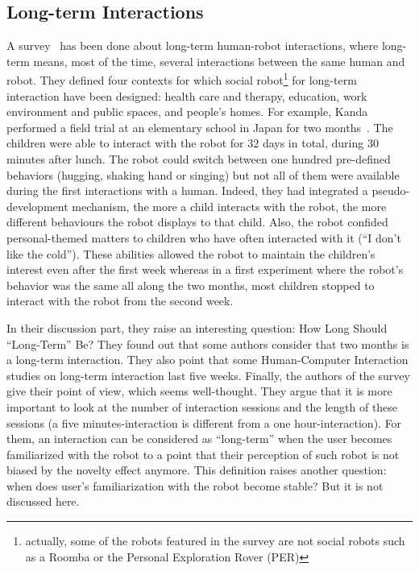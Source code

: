 \documentclass[a4paper,11pt,twoside]{StyleThese}
\begin{document}
\subsection{Long-term Interactions}
A survey~\cite{leite_2013_social} has been done about long-term human-robot interactions, where long-term means, most of the time, several interactions between the same human and robot. They defined four contexts for which social robot\footnote{actually, some of the robots featured in the survey are not social robots such as a Roomba or the Personal Exploration Rover (PER)} for long-term interaction have been designed: health care and therapy, education, work environment and public spaces, and people's homes. 
For example, Kanda \etal{} performed a field trial at an elementary school in Japan for two months~\cite{kanda_2007_two}. The children were able to interact with the robot for 32 days in total, during 30 minutes after lunch. The robot could switch between one hundred pre-defined behaviors (\eg hugging, shaking hand or singing) but not all of them were available during the first interactions with a human. Indeed, they had integrated a pseudo-development mechanism, \ie the more a child interacts with the robot, the more different behaviours the robot displays to that child. Also, the robot confided personal-themed matters to children who have often interacted with it (\eg ``I don't like the cold''). These abilities allowed the robot to maintain the children's interest even after the first week whereas in a first experiment where the robot's behavior was the same all along the two months, most children stopped to interact with the robot from the second week. 

In their discussion part, they raise an interesting question: How Long Should ``Long-Term'' Be? They found out that some authors consider that two months is a long-term interaction. They also point that some Human-Computer Interaction studies on long-term interaction last five weeks. Finally, the authors of the survey give their point of view, which seems well-thought. They argue that it is more important to look at the number of interaction sessions and the length of these sessions (a five minutes-interaction is different from a one hour-interaction). For them, an interaction can be considered as ``long-term'' when the user becomes familiarized with the robot to a point that their perception of such robot is not biased by the novelty effect anymore. This definition raises another question: when does user’s familiarization with the robot become stable? But it is not discussed here.
\end{document}
